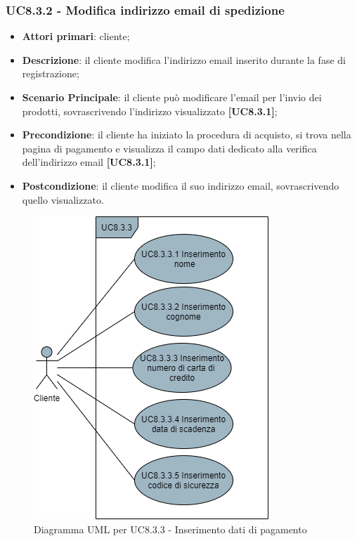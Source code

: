 \subsubsection{UC8.3.2 - Modifica indirizzo email di spedizione}
\begin{itemize}
\item \textbf{Attori primari}: cliente;
\item \textbf{Descrizione}: il cliente modifica l'indirizzo email inserito durante la fase di registrazione;
\item \textbf{Scenario Principale}: il cliente può modificare l'email per l'invio dei prodotti, sovrascrivendo l'indirizzo visualizzato \textbf{[UC8.3.1]};
\item \textbf{Precondizione}:  il cliente ha iniziato la procedura di acquisto, si trova nella pagina di pagamento e visualizza il campo dati dedicato alla verifica dell'indirizzo email \textbf{[UC8.3.1]};
\item \textbf{Postcondizione}: il cliente modifica il suo indirizzo email, sovrascrivendo quello visualizzato.
\end{itemize}

\begin{figure}[H]
\centering
\includegraphics[scale=0.6]{res/UseCase/Immagini/InserimentoDatiPagamento}
\caption{Diagramma UML per UC8.3.3 - Inserimento dati di pagamento}
\end{figure}

